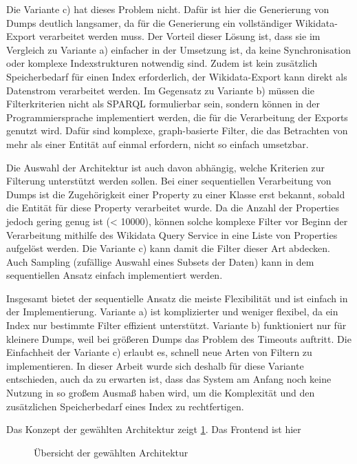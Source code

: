 Die Variante c) hat dieses Problem nicht.
Dafür ist hier die Generierung von Dumps deutlich langsamer, da für die Generierung ein vollständiger Wikidata-Export verarbeitet werden muss.
Der Vorteil dieser Lösung ist, dass sie im Vergleich zu Variante a) einfacher in der Umsetzung ist, da keine Synchronisation oder komplexe Indexstrukturen notwendig sind.
Zudem ist kein zusätzlich Speicherbedarf für einen Index erforderlich, der Wikidata-Export kann direkt als Datenstrom verarbeitet werden.
Im Gegensatz zu Variante b) müssen die Filterkriterien nicht als SPARQL formulierbar sein, sondern können in der Programmiersprache implementiert werden, die für die Verarbeitung der Exports genutzt wird.
Dafür sind komplexe, graph-basierte Filter, die das Betrachten von mehr als einer Entität auf einmal erfordern, nicht so einfach umsetzbar.

Die Auswahl der Architektur ist auch davon abhängig, welche Kriterien zur Filterung unterstützt werden sollen.
Bei einer sequentiellen Verarbeitung von Dumps ist die Zugehörigkeit einer Property zu einer Klasse erst bekannt, sobald die Entität für diese Property verarbeitet wurde.
Da die Anzahl der Properties jedoch gering genug ist (< 10000), können solche komplexe Filter vor Beginn der Verarbeitung mithilfe des Wikidata Query Service in eine Liste von Properties aufgelöst werden.
Die Variante c) kann damit die Filter dieser Art abdecken.
Auch Sampling (zufällige Auswahl eines Subsets der Daten) kann in dem sequentiellen Ansatz einfach implementiert werden.

Insgesamt bietet der sequentielle Ansatz die meiste Flexibilität und ist einfach in der Implementierung.
Variante a) ist komplizierter und weniger flexibel, da ein Index nur bestimmte Filter effizient unterstützt.
Variante b) funktioniert nur für kleinere Dumps, weil bei größeren Dumps das Problem des Timeouts auftritt.
Die Einfachheit der Variante c) erlaubt es, schnell neue Arten von Filtern zu implementieren.
In dieser Arbeit wurde sich deshalb für diese Variante entschieden, auch da zu erwarten ist, dass das System am Anfang noch keine Nutzung in so großem Ausmaß haben wird, um die Komplexität und den zusätzlichen Speicherbedarf eines Index zu rechtfertigen.

Das Konzept der gewählten Architektur zeigt \cref{fig:arch}.
Das Frontend ist hier %

\begin{figure}
  
  \caption{Übersicht der gewählten Architektur}
  \label{fig:arch}
\end{figure}

